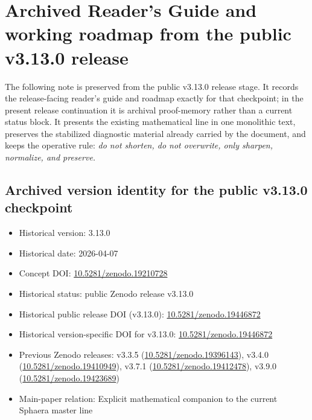 \section*{Archived Reader's Guide and working roadmap from the public v3.13.0 release}

The following note is preserved from the public v3.13.0 release stage. It records the release-facing reader's guide and roadmap exactly for that checkpoint; in the present release continuation it is archival proof-memory rather than a current status block.
It presents the existing mathematical line in one monolithic text, preserves the stabilized diagnostic material already carried by the document, and keeps the operative rule:
\emph{do not shorten, do not overwrite, only sharpen, normalize, and preserve.}

\subsection*{Archived version identity for the public v3.13.0 checkpoint}
\begin{itemize}[leftmargin=2em]
  \item Historical version: 3.13.0
  \item Historical date: 2026-04-07
  \item Concept DOI: \href{https://doi.org/10.5281/zenodo.19210728}{10.5281/zenodo.19210728}
  \item Historical status: public Zenodo release v3.13.0
  \item Historical public release DOI (v3.13.0): \href{https://doi.org/10.5281/zenodo.19446872}{10.5281/zenodo.19446872}
  \item Historical version-specific DOI for v3.13.0: \href{https://doi.org/10.5281/zenodo.19446872}{10.5281/zenodo.19446872}
  \item Previous Zenodo releases: v3.3.5 (\href{https://doi.org/10.5281/zenodo.19396143}{10.5281/zenodo.19396143}), v3.4.0 (\href{https://doi.org/10.5281/zenodo.19410949}{10.5281/zenodo.19410949}), v3.7.1 (\href{https://doi.org/10.5281/zenodo.19412478}{10.5281/zenodo.19412478}), v3.9.0 (\href{https://doi.org/10.5281/zenodo.19423689}{10.5281/zenodo.19423689})
  \item Main-paper relation: Explicit mathematical companion to the current Sphaera master line~\cite{brendecke2026main}
\end{itemize}

